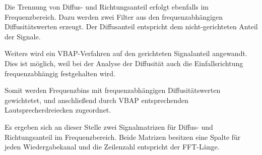 

Die Trennung von Diffus- und Richtungsanteil erfolgt ebenfalls im Frequenzbereich. Dazu werden zwei Filter aus den frequenzabhängigen Diffusitätswerten erzeugt. Der Diffusanteil entspricht dem nicht-gerichteten Anteil der Signale.

Weiters wird ein VBAP-Verfahren auf den gerichteten Signalanteil angewandt. Dies ist möglich, weil bei der Analyse der Diffusität auch die Einfallsrichtung frequenzabhängig festgehalten wird.

Somit werden Frequenzbins mit frequenzabhängigen Diffusitätswerten gewichtetet, und anschließend durch VBAP entsprechenden Lautsprecherdreiecken zugeordnet.

Es ergeben sich an dieser Stelle zwei Signalmatrizen für Diffus- und Richtungsanteil im Frequenzbereich. Beide Matrizen besitzen eine Spalte für jeden Wiedergabekanal und die Zeilenzahl entspricht der FFT-Länge.